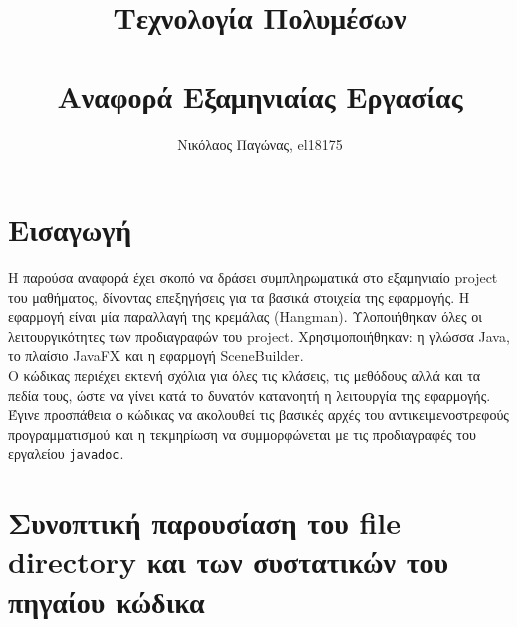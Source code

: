 \documentclass[a4paper, 12pt]{article}
\title{
	\textbf{Τεχνολογία Πολυμέσων} \\~\\
	Αναφορά Εξαμηνιαίας Εργασίας
}
\author{Νικόλαος Παγώνας, el18175}
\date{}
\begin{document}
\maketitle
	
\section{Εισαγωγή}

Η παρούσα αναφορά έχει σκοπό να δράσει συμπληρωματικά στο εξαμηνιαίο project του μαθήματος, δίνοντας επεξηγήσεις για τα βασικά στοιχεία της εφαρμογής. Η εφαρμογή είναι μία παραλλαγή της κρεμάλας (Hangman). Υλοποιήθηκαν όλες οι λειτουργικότητες των προδιαγραφών του project. Χρησιμοποιήθηκαν: η γλώσσα Java, το πλαίσιο JavaFX και η εφαρμογή SceneBuilder. \\

Ο κώδικας περιέχει εκτενή σχόλια για όλες τις κλάσεις, τις μεθόδους αλλά και τα πεδία τους, ώστε να γίνει κατά το δυνατόν κατανοητή η λειτουργία της εφαρμογής. Έγινε προσπάθεια ο κώδικας να ακολουθεί τις βασικές αρχές του αντικειμενοστρεφούς προγραμματισμού και η τεκμηρίωση να συμμορφώνεται με τις προδιαγραφές του εργαλείου \verb|javadoc|. \\

\section{Συνοπτική παρουσίαση του file directory και των συστατικών του πηγαίου κώδικα}
	
\end{document}
